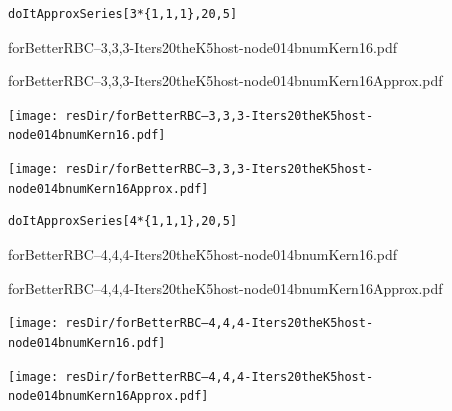 \documentclass[12pt]{article}
\begin{document}
\newpage


\begin{verbatim}
doItApproxSeries[3*{1,1,1},20,5]
\end{verbatim}

forBetterRBC--3,3,3-Iters20theK5host-node014bnumKern16.pdf


forBetterRBC--3,3,3-Iters20theK5host-node014bnumKern16Approx.pdf


\ifmacosx
  \fi
\iflinux
  \texttt{[image: resDir/forBetterRBC--3,3,3-Iters20theK5host-node014bnumKern16.pdf]}

  \texttt{[image: resDir/forBetterRBC--3,3,3-Iters20theK5host-node014bnumKern16Approx.pdf]}
\fi



\newpage

\begin{verbatim}
doItApproxSeries[4*{1,1,1},20,5]
\end{verbatim}

forBetterRBC--4,4,4-Iters20theK5host-node014bnumKern16.pdf


forBetterRBC--4,4,4-Iters20theK5host-node014bnumKern16Approx.pdf


\ifmacosx
  \fi
\iflinux
  \texttt{[image: resDir/forBetterRBC--4,4,4-Iters20theK5host-node014bnumKern16.pdf]}

  \texttt{[image: resDir/forBetterRBC--4,4,4-Iters20theK5host-node014bnumKern16Approx.pdf]}
\fi
\end{document}
